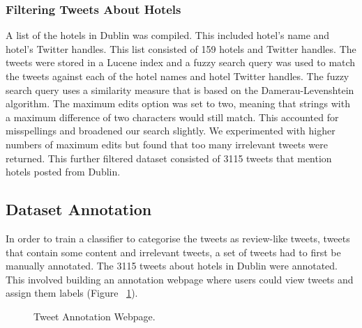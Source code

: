 \subsubsection{Filtering Tweets About Hotels}
A list of the hotels in Dublin was compiled. This included hotel's name and hotel's Twitter handles. This list consisted of 159 hotels and Twitter handles. The tweets were stored in a Lucene index and a fuzzy search query was used to match the tweets against each of the hotel names and hotel Twitter handles. The fuzzy search query uses a similarity measure that is based on the Damerau-Levenshtein algorithm. The maximum edits option was set to two, meaning that strings with a maximum difference of two characters would still match. This accounted for misspellings and broadened our search slightly. We experimented with higher numbers of maximum edits but found that too many irrelevant tweets were returned. This further filtered dataset consisted of 3115 tweets that mention hotels posted from Dublin.

\subsection{Dataset Annotation}

In order to train a classifier to categorise the tweets as review-like tweets, tweets that contain some content and irrelevant tweets, a set of tweets had to first be manually annotated. The 3115 tweets about hotels in Dublin were annotated. This involved building an annotation webpage where users could view tweets and assign them labels (Figure ~\ref{fig:webpage}).

\begin{figure}[h!]
\centering
{}
\caption{\label{fig:webpage} Tweet Annotation Webpage.}
\end{figure}

